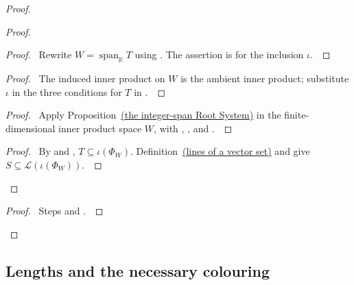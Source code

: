 \documentclass[11pt]{amsart}
\let\qed\relax
\newcommand\cL{{\mathcal L}}
\newcommand\re{{\mathbb R}}%
\newcommand\opk[1]{\mathop{\mathrm{#1}}\nolimits}
\newcommand\sbs{\subseteq}
\begin{document}
\begin{proof}
\begin{proof}
 \begin{proof}\pf\ Rewrite $W=\opk{span}_{\re}T$ using
 . The assertion is
  for the inclusion $\iota$.~\qed\end{proof}
 \begin{proof}\pf\ The induced inner product on $W$ is the ambient
 inner product; substitute $\iota$ in the three conditions for $T$
 in .~\qed\end{proof}
 \begin{proof}\pf\ Apply Proposition~\hyperref[prop:312-rootset]{(the integer-span Root System)} in the
 finite-dimensional inner product space $W$, with
 , , and
 .~\qed\end{proof}
 \qedstep
 \begin{proof}\pf\ By  and
 , $T\sbs\iota(\Phi_W)$.
 Definition~\hyperref[def:312-root-lines]{(lines of a vector set)} and 
 give $S\sbs\cL(\iota(\Phi_W))$.~\qed\end{proof}
\end{proof}
\qedstep
\begin{proof}\pf\ Steps  and .~\qed\end{proof}
\end{proof}

\subsection{Lengths and the necessary colouring}
\end{document}
